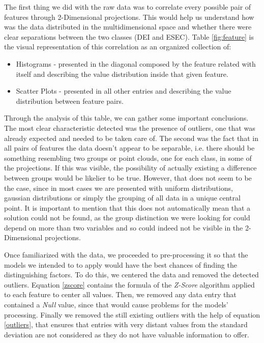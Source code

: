 \documentclass[extendedabs]{recpad2k}
\begin{document}
The first thing we did with the raw data was to correlate every possible pair of features through 2-Dimensional projections.
This would help us understand how was the data distributed in the multidimensional space and whether there were clear separations between the two classes 
(DEI and ESEC).
Table \ref{fig:feature} is the visual representation of this correlation as an organized collection of:
\begin{itemize}[noitemsep,nolistsep]
\item Histograms - presented in the diagonal composed by the feature related with itself and describing the value distribution inside that given feature.
\item Scatter Plots - presented in all other entries and describing the value distribution between feature pairs.
\end{itemize}

Through the analysis of this table, we can gather some important conclusions. 
The most clear characteristic detected was the presence of outliers, one that was already expected and needed to be taken care of.
The second was the fact that in all pairs of features the data doesn't appear to be separable, i.e. there should be something resembling two groups or point clouds,
one for each class, in some of the projections.
If this was visible, the possibility of actually existing a difference between groups would be likelier to be true.
However, that does not seem to be the case, since in most cases we are presented with uniform distributions, gaussian distributions or simply the grouping of 
all data in a unique central point. 
It is important to mention that this does not automatically mean that a solution could not be found, as the group distinction we were looking for could depend 
on more than two variables and so could indeed not be visible in the 2-Dimensional projections.

Once familiarized with the data, we proceeded to pre-processing it so that the models we intended to to apply would have the best chances of finding the 
distinguishing factors.
To do this, we centered the data and removed the detected outliers.
Equation \ref{zscore} contains the formula of the \textit{Z-Score} algorithm applied to each feature to center all values.
Then, we removed any data entry that contained a \textit{Null} value, since that would cause problems for the models' processing.
Finally we removed the still existing outliers with the help of equation \ref{outliers}, that ensures that entries with very distant values from the standard 
deviation are not considered as they do not have valuable information to offer.
\end{document}
